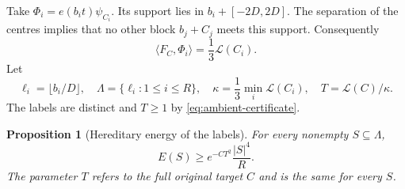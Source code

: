 \documentclass[11pt,reqno]{amsart}
\numberwithin{equation}{section}
\newtheorem{proposition}[theorem]{Proposition}
\theoremstyle{definition}
\theoremstyle{remark}
\newcommand{\La}{\mathcal L}
\newcommand{\ip}[2]{\langle#1,#2\rangle}
\begin{document}
Take $\Phi_i=e(b_it)\psi_{C_i}$. Its support lies in
$b_i+[-2D,2D]$. The separation of the centres implies that no other
block $b_j+C_j$ meets this support. Consequently
\begin{equation}\label{eq:ambient-certificate}
 \ip{F_C}{\Phi_i}=\frac13\La(C_i).
\end{equation}
Let
\begin{equation}\label{eq:label-def}
 \ell_i=\lfloor b_i/D\rfloor,
 \quad \Lambda=\{\ell_i:1\le i\le R\},
 \quad\kappa=\frac13\min_i\La(C_i),
 \quad T=\La(C)/\kappa.
\end{equation}
The labels are distinct and $T\ge1$ by \eqref{eq:ambient-certificate}.

\begin{proposition}[Hereditary energy of the labels]\label{prop:packet-hered}
For every nonempty $S\subseteq\Lambda$,
\begin{equation}\label{eq:packet-hered}
 E(S)\ge e^{-CT^2}\frac{|S|^4}{R}.
\end{equation}
The parameter $T$ refers to the full original target $C$ and is the same
for every $S$.
\end{proposition}
\end{document}
